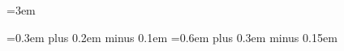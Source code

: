 
\pagestyle{fancy}

\renewcommand{\baselinestretch}{1.5}


\emergencystretch=3em

\spaceskip=0.3em plus 0.2em minus 0.1em
\xspaceskip=0.6em plus 0.3em minus 0.15em




